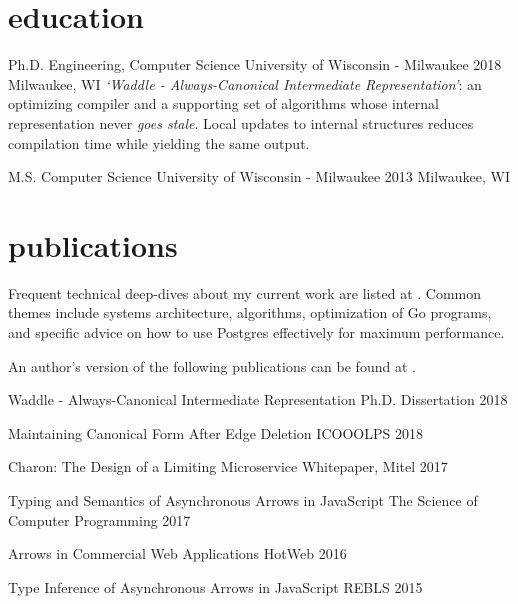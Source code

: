 \documentclass[]{clean-resume}
\begin{document}
\section{education}

\detailentry
  {Ph.D. Engineering, Computer Science}
  {University of Wisconsin - Milwaukee}
  {2018}
  {Milwaukee, WI}
  {
    \emph{`Waddle - Always-Canonical Intermediate Representation'}: an optimizing compiler and a supporting set of algorithms whose internal representation never \emph{goes stale}. Local updates to internal structures reduces compilation time while yielding the same output.
  }

\detailentry
  {M.S. Computer Science}
  {University of Wisconsin - Milwaukee}
  {2013}
  {Milwaukee, WI}
  {}

\section{publications}

Frequent technical deep-dives about my current work are listed at \articeslink. Common themes include systems architecture, algorithms, optimization of Go programs, and specific advice on how to use Postgres effectively for maximum performance.

An author's version of the following publications can be found at \paperslink.

\lineentry
  {Waddle - Always-Canonical Intermediate Representation}
  {Ph.D. Dissertation}
  {2018}

\lineentry
  {Maintaining Canonical Form After Edge Deletion}
  {ICOOOLPS}
  {2018}

\lineentry
  {Charon: The Design of a Limiting Microservice}
  {Whitepaper, Mitel}
  {2017}

\lineentry
  {Typing and Semantics of Asynchronous Arrows in JavaScript}
  {The Science of Computer Programming}
  {2017}

\lineentry
  {Arrows in Commercial Web Applications}
  {HotWeb}
  {2016}

\lineentry
  {Type Inference of Asynchronous Arrows in JavaScript}
  {REBLS}
  {2015}
\end{document}
